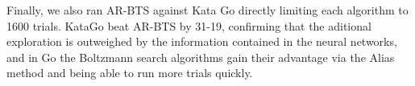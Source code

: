 \documentclass{article}
\theoremstyle{plain}
\begin{document}
\begin{appendices}
            
            
            Finally, we also ran AR-BTS against Kata Go directly limiting each algorithm to 1600 trials. KataGo beat AR-BTS by 31-19, confirming that the aditional exploration is outweighed by the information contained in the neural networks, and in Go the Boltzmann search algorithms gain their advantage via the Alias method and being able to run more trials quickly.







%
%
%
%
%
%
%

\end{appendices}
\end{document}
